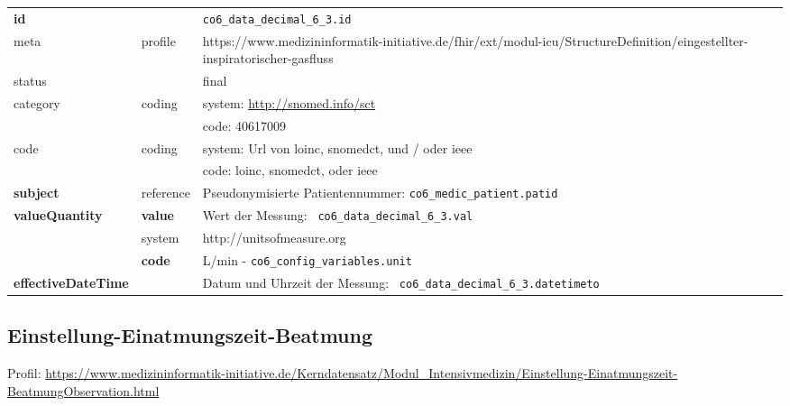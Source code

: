 \begin{longtable}{|l|l|p{7.5cm}|}
	\hline
	\rowcolor{lightgray} \multicolumn{3}{|l|}{Data Mapping (inhaltlich)} \\ \hline
	\textbf{id} &  & \texttt{co6\_data\_decimal\_6\_3.id} \\ \hline
	meta & profile & https://www.medizininformatik-initiative.de/fhir/ext/modul-icu/StructureDefinition/eingestellter-inspiratorischer-gasfluss \\ \hline 
	status &  & final   \\ \hline 
	category & coding & system: \url{http://snomed.info/sct} \\
	\cline{3-3}
	& & code: 40617009 \\ \hline
	code & coding & system: Url von \ac{loinc}, \ac{snomedct}, und / oder \ac{ieee} \\ 
	\cline{3-3} 
	&  & code: \ac{loinc}, \ac{snomedct}, oder \ac{ieee} \\ \hline
	\textbf{subject}  & reference & Pseudonymisierte Patientennummer: \texttt{co6\_medic\_patient.patid} \\ \hline
	\textbf{valueQuantity}  & \textbf{value} & Wert der Messung: \texttt{
		co6\_data\_decimal\_6\_3.val} \\
	\cline{2-3}
	& system & http://unitsofmeasure.org \\
	\cline{2-3}
	& \textbf{code} &
	L/min - \texttt{co6\_config\_variables.unit}
	\\ \hline
	\textbf{effectiveDateTime}  & & Datum und Uhrzeit der Messung: \texttt{
		co6\_data\_decimal\_6\_3.datetimeto} \\ \hline
\end{longtable}

\subsection{Einstellung-Einatmungszeit-Beatmung}

Profil: \url{https://www.medizininformatik-initiative.de/Kerndatensatz/Modul_Intensivmedizin/Einstellung-Einatmungszeit-BeatmungObservation.html}


